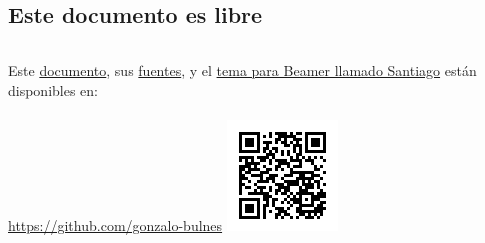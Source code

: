   \begin{frame}{\insertsubsection}
    {}
    
  \end{frame}

%
\subsection{Este documento es libre}


  \begin{frame}{\insertsubsection}

    \footnotesize
      \begin{columns}
          Este \href{https://github.com/gonzalo-bulnes/introduction-to-tests}{documento}, sus \href{hhttps://github.com/gonzalo-bulnes/introduction-to-tests}{fuentes}, y el \href{https://github.com/gonzalo-bulnes/santiago-beamer-theme}{tema para Beamer llamado Santiago} están disponibles en:\\~\\
          \url{https://github.com/gonzalo-bulnes}
        \hfill\includegraphics[width=\textwidth]{../../src/images/sources-talk.png}
      \end{columns}
    \normalsize


\end{frame}
